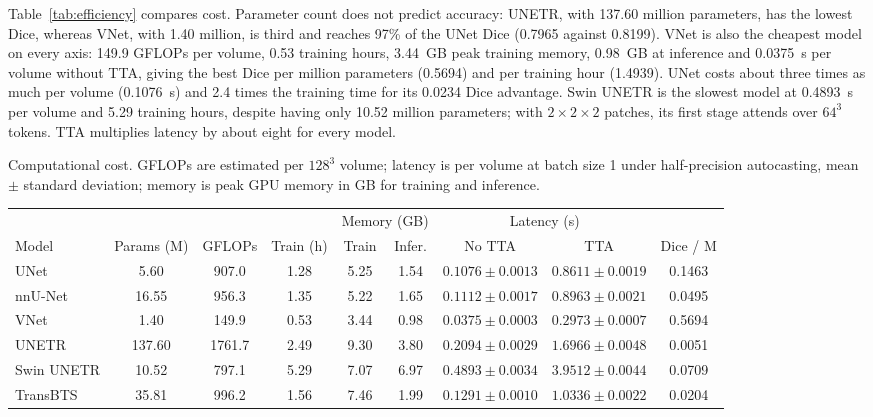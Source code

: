 \documentclass[a4paper,fleqn]{cas-sc}
\begin{document}
Table~\ref{tab:efficiency} compares cost. Parameter count does not predict accuracy: UNETR, with 137.60 million parameters, has the lowest Dice, whereas VNet, with 1.40 million, is third and reaches 97\% of the UNet Dice (0.7965 against 0.8199). VNet is also the cheapest model on every axis: 149.9 GFLOPs per volume, 0.53 training hours, 3.44~GB peak training memory, 0.98~GB at inference and 0.0375~s per volume without TTA, giving the best Dice per million parameters (0.5694) and per training hour (1.4939). UNet costs about three times as much per volume (0.1076~s) and 2.4 times the training time for its 0.0234 Dice advantage. Swin UNETR is the slowest model at 0.4893~s per volume and 5.29 training hours, despite having only 10.52 million parameters; with $2\times 2\times 2$ patches, its first stage attends over $64^3$ tokens. TTA multiplies latency by about eight for every model.

\begin{heretable}
\centering
\caption{Computational cost. GFLOPs are estimated per $128^3$ volume; latency is per volume at batch size 1 under half-precision autocasting, mean $\pm$ standard deviation; memory is peak GPU memory in GB for training and inference.}
\label{tab:efficiency}
\small
\setlength{\tabcolsep}{3pt}
\begin{tabular*}{\textwidth}{@{\extracolsep{\fill}}lcccccccc@{}}
\toprule
 & & & & \multicolumn{2}{c}{Memory (GB)} & \multicolumn{2}{c}{Latency (s)} & \\
\cmidrule(lr){5-6}\cmidrule(lr){7-8}
Model & Params (M) & GFLOPs & Train (h) & Train & Infer. & No TTA & TTA & Dice / M \\
\midrule
UNet & 5.60 & 907.0 & 1.28 & 5.25 & 1.54 & $0.1076\pm 0.0013$ & $0.8611\pm 0.0019$ & 0.1463 \\
nnU-Net & 16.55 & 956.3 & 1.35 & 5.22 & 1.65 & $0.1112\pm 0.0017$ & $0.8963\pm 0.0021$ & 0.0495 \\
VNet & 1.40 & 149.9 & 0.53 & 3.44 & 0.98 & $0.0375\pm 0.0003$ & $0.2973\pm 0.0007$ & 0.5694 \\
UNETR & 137.60 & 1761.7 & 2.49 & 9.30 & 3.80 & $0.2094\pm 0.0029$ & $1.6966\pm 0.0048$ & 0.0051 \\
Swin UNETR & 10.52 & 797.1 & 5.29 & 7.07 & 6.97 & $0.4893\pm 0.0034$ & $3.9512\pm 0.0044$ & 0.0709 \\
TransBTS & 35.81 & 996.2 & 1.56 & 7.46 & 1.99 & $0.1291\pm 0.0010$ & $1.0336\pm 0.0022$ & 0.0204 \\
\bottomrule
\end{tabular*}
\end{heretable}
\end{document}
